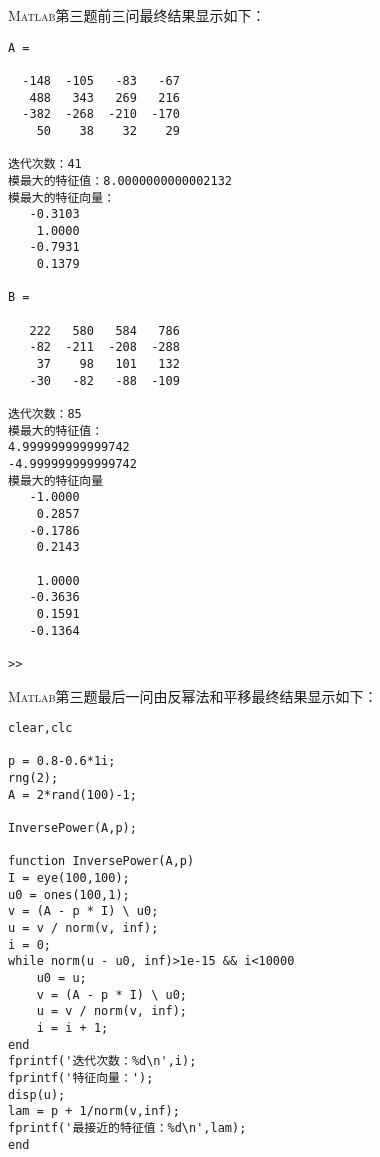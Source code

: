 \documentclass[12pt,a4paper,utf8]{ctexart}
\begin{document}
\begin{enumerate}
\textsc{Matlab}第三题前三问最终结果显示如下：
\begin{lstlisting}[frame=single]
A =

  -148  -105   -83   -67
   488   343   269   216
  -382  -268  -210  -170
    50    38    32    29

迭代次数：41
模最大的特征值：8.0000000000002132
模最大的特征向量：
   -0.3103
    1.0000
   -0.7931
    0.1379

B =

   222   580   584   786
   -82  -211  -208  -288
    37    98   101   132
   -30   -82   -88  -109

迭代次数：85
模最大的特征值：
4.999999999999742
-4.999999999999742
模最大的特征向量
   -1.0000
    0.2857
   -0.1786
    0.2143

    1.0000
   -0.3636
    0.1591
   -0.1364

>> 
\end{lstlisting}

\textsc{Matlab}第三题最后一问由反幂法和平移最终结果显示如下：
\begin{lstlisting}[frame=single]
clear,clc

p = 0.8-0.6*1i;
rng(2);
A = 2*rand(100)-1;

InversePower(A,p);

function InversePower(A,p)
I = eye(100,100);
u0 = ones(100,1);
v = (A - p * I) \ u0;
u = v / norm(v, inf);
i = 0;
while norm(u - u0, inf)>1e-15 && i<10000
    u0 = u;
    v = (A - p * I) \ u0;
    u = v / norm(v, inf);
    i = i + 1;
end
fprintf('迭代次数：%d\n',i);
fprintf('特征向量：');
disp(u);
lam = p + 1/norm(v,inf);
fprintf('最接近的特征值：%d\n',lam);
end
\end{lstlisting}




\end{enumerate}
\end{document}

